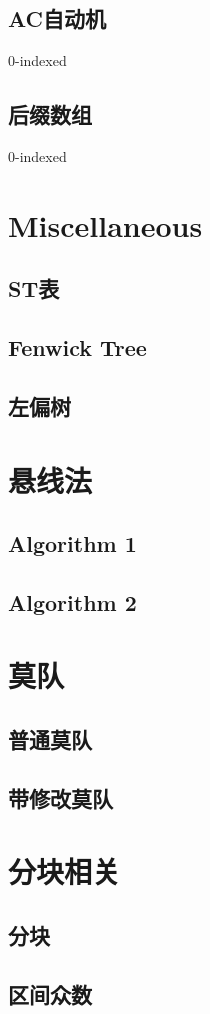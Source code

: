 \documentclass{article}
\begin{document}
		\subsection{AC自动机}
		0-indexed
		
		\subsection{后缀数组}
		0-indexed
		

	\newpage

	\section{Miscellaneous}
		\subsection{ST表}
		\subsection{Fenwick Tree}
		\subsection{左偏树}
	\newpage

	\section{悬线法}
		\subsection{Algorithm 1}
		\subsection{Algorithm 2}

	\newpage

	\section{莫队}
		\subsection{普通莫队}
		\subsection{带修改莫队}

	\newpage

	\section{分块相关}
		\subsection{分块}
		\subsection{区间众数}
\end{document}
